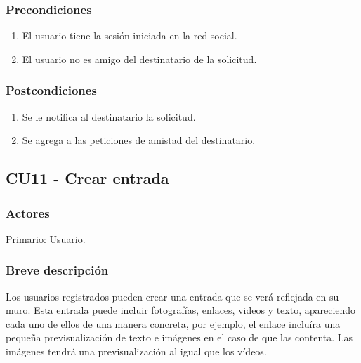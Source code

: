 \documentclass[12pt, a4paper, titlepage]{article}
\begin{document}
\subsubsection{Precondiciones}
\begin{enumerate}
	\item El usuario tiene la sesión iniciada en la red social.
	\item El usuario no es amigo del destinatario de la solicitud.
\end{enumerate}
\subsubsection{Postcondiciones}
\begin{enumerate}
	\item Se le notifica al destinatario la solicitud.
	\item Se agrega a las peticiones de amistad del destinatario.
\end{enumerate}

\subsection{CU11 - Crear entrada}
\subsubsection{Actores}
Primario: Usuario.
\subsubsection{Breve descripción}
Los usuarios registrados pueden crear una entrada que se verá reflejada en su muro. Esta entrada puede incluir fotografías, enlaces, videos y texto, apareciendo cada uno de ellos de una manera concreta, por ejemplo, el enlace incluíra una pequeña previsualización de texto e imágenes en el caso de que las contenta. Las imágenes tendrá una previsualización al igual que los vídeos.
\end{document}
